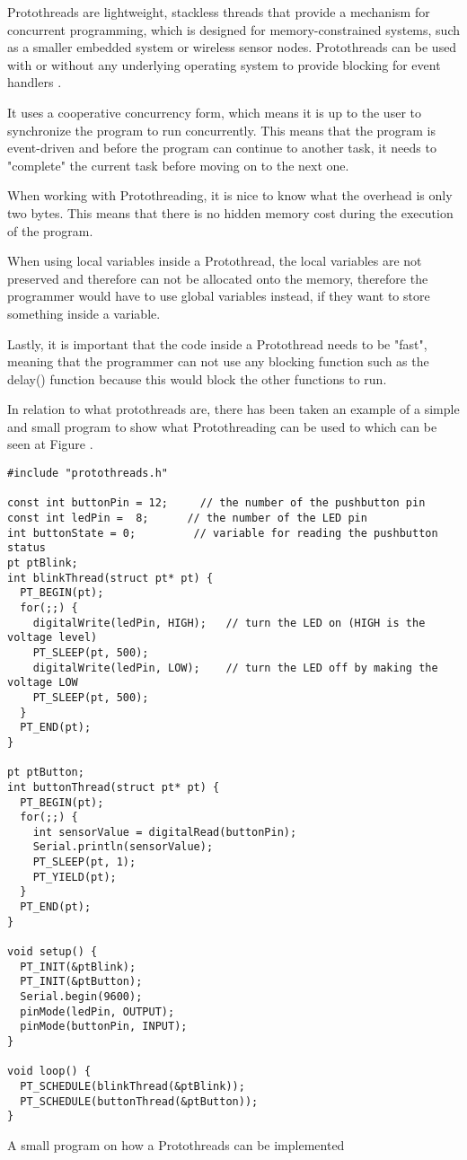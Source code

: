 Protothreads are lightweight, stackless threads that provide a mechanism for concurrent programming, which is designed for memory-constrained systems, such as a smaller embedded system or wireless sensor nodes. Protothreads can be used with or without any underlying operating system to provide blocking for event handlers \cite{AdamDunkelProtothreads}.

It uses a cooperative concurrency form, which means it is up to the user to synchronize the program to run concurrently. This means that the program is event-driven and before the program can continue to another task, it needs to "complete" the current task before moving on to the next one.

When working with Protothreading, it is nice to know what the overhead is only two bytes. This means that there is no hidden memory cost during the execution of the program. 

When using local variables inside a Protothread, the local variables are not preserved and therefore can not be allocated onto the memory, therefore the programmer would have to use global variables instead, if they want to store something inside a variable.

Lastly, it is important that the code inside a Protothread needs to be "fast", meaning that the programmer can not use any blocking function such as the delay() function because this would block the other functions to run. \cite{AdamDunkelProtothreads}

In relation to what protothreads are, there has been taken an example of a simple and small program to show what Protothreading can be used to which can be seen at Figure  \cite{ArduinoProtothreadsTutorial2019}.

\begin{listing}[htb!]
\centering
\begin{verbatim}
#include "protothreads.h"

const int buttonPin = 12;     // the number of the pushbutton pin
const int ledPin =  8;      // the number of the LED pin
int buttonState = 0;         // variable for reading the pushbutton status
pt ptBlink;
int blinkThread(struct pt* pt) {
  PT_BEGIN(pt);
  for(;;) {
    digitalWrite(ledPin, HIGH);   // turn the LED on (HIGH is the voltage level)
    PT_SLEEP(pt, 500);
    digitalWrite(ledPin, LOW);    // turn the LED off by making the voltage LOW
    PT_SLEEP(pt, 500);
  }
  PT_END(pt);
}

pt ptButton;
int buttonThread(struct pt* pt) {
  PT_BEGIN(pt);
  for(;;) {
    int sensorValue = digitalRead(buttonPin);
    Serial.println(sensorValue);
    PT_SLEEP(pt, 1);
    PT_YIELD(pt);
  }
  PT_END(pt);
}

void setup() {
  PT_INIT(&ptBlink);
  PT_INIT(&ptButton);
  Serial.begin(9600);
  pinMode(ledPin, OUTPUT);
  pinMode(buttonPin, INPUT);
}

void loop() {
  PT_SCHEDULE(blinkThread(&ptBlink));
  PT_SCHEDULE(buttonThread(&ptButton));
}
\end{verbatim}
\caption{A small program on how a Protothreads can be implemented}
\label{List: Protothreads example}
\end{listing}

